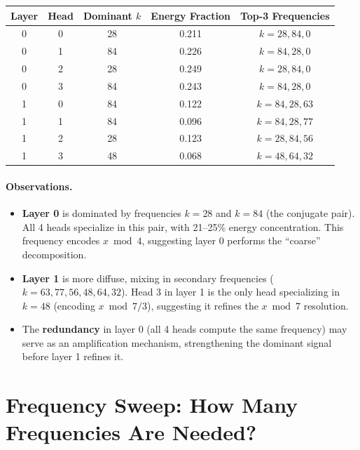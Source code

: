 \documentclass[11pt]{article}
\begin{document}
\begin{center}
\begin{tabular}{ccccc}
\toprule
Layer & Head & Dominant $k$ & Energy Fraction & Top-3 Frequencies \\
\midrule
0 & 0 & 28 & 0.211 & $k=28, 84, 0$ \\
0 & 1 & 84 & 0.226 & $k=84, 28, 0$ \\
0 & 2 & 28 & 0.249 & $k=28, 84, 0$ \\
0 & 3 & 84 & 0.243 & $k=84, 28, 0$ \\
1 & 0 & 84 & 0.122 & $k=84, 28, 63$ \\
1 & 1 & 84 & 0.096 & $k=84, 28, 77$ \\
1 & 2 & 28 & 0.123 & $k=28, 84, 56$ \\
1 & 3 & 48 & 0.068 & $k=48, 64, 32$ \\
\bottomrule
\end{tabular}
\end{center}

\paragraph{Observations.}
\begin{itemize}[leftmargin=*]
    \item \textbf{Layer 0} is dominated by frequencies $k = 28$ and $k = 84$ (the conjugate pair). All 4 heads specialize in this pair, with 21--25\% energy concentration. This frequency encodes $x \bmod 4$, suggesting layer 0 performs the ``coarse'' decomposition.
    \item \textbf{Layer 1} is more diffuse, mixing in secondary frequencies ($k = 63, 77, 56, 48, 64, 32$). Head 3 in layer 1 is the only head specializing in $k = 48$ (encoding $x \bmod 7/3$), suggesting it refines the $x \bmod 7$ resolution.
    \item The \textbf{redundancy} in layer 0 (all 4 heads compute the same frequency) may serve as an amplification mechanism, strengthening the dominant signal before layer 1 refines it.
\end{itemize}


\section{Frequency Sweep: How Many Frequencies Are Needed?}
\end{document}
